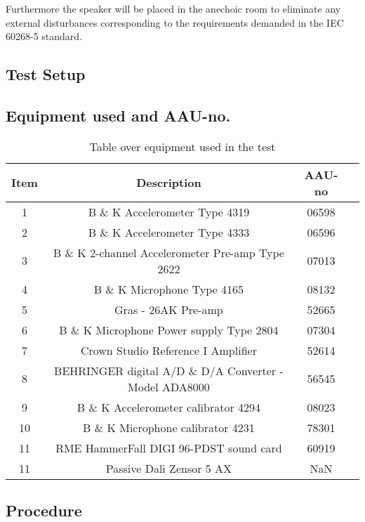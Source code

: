 Furthermore the speaker will be placed in the anechoic room to eliminate any external disturbances corresponding to the requirements demanded in the 
IEC 60268-5 standard.

\subsection*{Test Setup}

\subsection*{Equipment used and AAU-no.}

\begin{table}[H]
\centering
{}
\begin{tabular}{S[table-format=1]ccc} \toprule
    {Item} & {Description} & {AAU-no} \\       &  B \& K Accelerometer Type 4319  & 06598   \\ 
    2      &  B \& K Accelerometer Type 4333  & 06596   \\ 
    3      &  B \& K 2-channel Accelerometer Pre-amp Type 2622  & 07013   \\
    4      &  B \& K Microphone Type 4165  & 08132   \\
    5      &  Gras - 26AK Pre-amp & 52665   \\
    6      &  B \& K Microphone Power supply Type 2804  & 07304   \\
    7      &  Crown Studio Reference I Amplifier & 52614   \\
    8      &  BEHRINGER digital A/D \& D/A Converter - Model ADA8000   & 56545   \\
    9      &  B \& K Accelerometer calibrator 4294 & 08023   \\
    10     &  B \& K Microphone calibrator 4231 & 78301   \\
    11     &  RME HammerFall DIGI 96-PDST sound card & 60919  \\
    11     &  Passive Dali Zensor 5 AX & NaN  \\ \bottomrule 
\end{tabular}
\caption{Table over equipment used in the test}
\label{tab:UsedEquipment1}
\end{table}
\vspace{-5mm}


\subsection{Procedure}\label{sec:SpeakerTestProcedure1}

